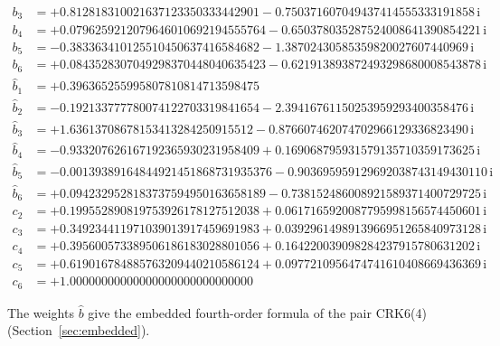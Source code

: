 {\begin{align*}
b_{3} &= +0.812818310021637123350333442901 - 0.750371607049437414555333191858\,\mathrm{i}\\
b_{4} &= +0.0796259212079646010692194555764 - 0.650378035287524008641390854221\,\mathrm{i}\\
b_{5} &= -0.383363410125510450637416584682 - 1.38702430585359820027607440969\,\mathrm{i}\\
b_{6} &= +0.0843528307049298370448040635423 - 0.621913893872493298680008543878\,\mathrm{i}\\[1mm]
\hat b_{1} &= +0.396365255995807810814713598475\\
\hat b_{2} &= -0.192133777780074122703319841654 - 2.39416761150253959293400358476\,\mathrm{i}\\
\hat b_{3} &= +1.63613708678153413284250915512 - 0.876607462074702966129336823490\,\mathrm{i}\\
\hat b_{4} &= -0.933207626167192365930231958409 + 0.169068795931579135710359173625\,\mathrm{i}\\
\hat b_{5} &= -0.00139389164844921451868731935376 - 0.903695959129692038743149430110\,\mathrm{i}\\
\hat b_{6} &= +0.0942329528183737594950163658189 - 0.738152486008921589371400729725\,\mathrm{i}\\[1mm]
c_{2} &= +0.199552890819753926178127512038 + 0.0617165920087795998156574450601\,\mathrm{i}\\
c_{3} &= +0.349234411971039013917459691983 + 0.0392961498913966951265840973128\,\mathrm{i}\\
c_{4} &= +0.395600573389506186183028801056 + 0.164220039098284237915780631202\,\mathrm{i}\\
c_{5} &= +0.619016784885763209440210586124 + 0.0977210956474741610408669436369\,\mathrm{i}\\
c_{6} &= +1.00000000000000000000000000000
\end{align*}
}

The weights $\hat b$ give the embedded fourth-order formula of the pair CRK6(4) (Section~\ref{sec:embedded}).
